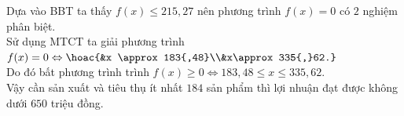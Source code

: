 \begin{ex}
{\begin{center}
		\end{center}
		Dựa vào BBT ta thấy $f(x) \leq 215{,}27$ nên phương trình $f(x) = 0 $ có $2$ nghiệm phân biệt.\\
		Sử dụng MTCT ta giải phương trình $f(x)=0 \Leftrightarrow \hoac{&x \approx 183{,48}\\&x\approx 335{,}62.}$\\
		Do đó bất phương trình trình $f(x) \geq 0 \Leftrightarrow 183{,}48 \leq x \leq 335{,}62$.\\
		Vậy cần sản xuất và tiêu thụ ít nhất $184$ sản phẩm thì lợi nhuận đạt được không dưới $650$ triệu đồng.
	}
\end{ex}

